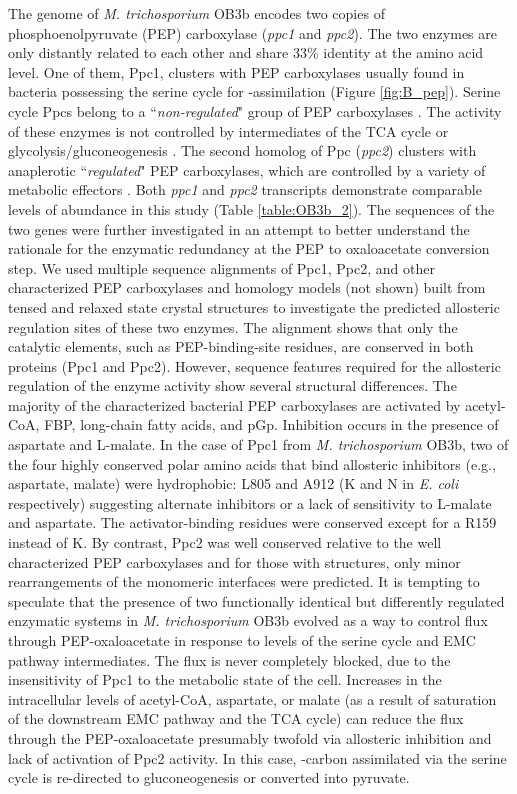 The genome of \textit{M. trichosporium} OB3b encodes two copies of phosphoenolpyruvate (PEP) carboxylase (\textit{ppc1} and \textit{ppc2}).
The two enzymes are only distantly related to each other and share 33\% identity at the amino acid level.
One of them, Ppc1, clusters with PEP carboxylases usually found in bacteria possessing the serine cycle for -assimilation (Figure \ref{fig:B_pep}).
Serine cycle Ppcs belong to a ``\textit{non-regulated}" group of PEP carboxylases \cite{anthony1982}.
The activity of these enzymes is not controlled by intermediates of the TCA cycle or glycolysis/gluconeogenesis \cite{newaz1975}.
The second homolog of Ppc (\textit{ppc2}) clusters with anaplerotic ``\textit{regulated}" PEP carboxylases, which are controlled by a variety of metabolic effectors \cite{takahashi1993, kai2003}.
Both \textit{ppc1} and \textit{ppc2} transcripts demonstrate comparable levels of abundance in this study (Table \ref{table:OB3b_2}).
The sequences of the two genes were further investigated in an attempt to better understand the rationale for the enzymatic redundancy at the PEP to oxaloacetate conversion step.
We used multiple sequence alignments of Ppc1, Ppc2, and other characterized PEP carboxylases and homology models (not shown) built from tensed and relaxed state crystal structures \cite{matsumura2002} to investigate the predicted allosteric regulation sites of these two enzymes.
The alignment shows that only the catalytic elements, such as PEP-binding-site residues, are conserved in both proteins (Ppc1 and Ppc2). %
However, sequence features required for the allosteric regulation of the enzyme activity show several structural differences.
The majority of the characterized bacterial PEP carboxylases are activated by acetyl-CoA, FBP, long-chain fatty acids, and pGp.
Inhibition occurs in the presence of aspartate and L-malate.
In the case of Ppc1 from \textit{M. trichosporium} OB3b, two of the four highly conserved polar amino acids that bind allosteric inhibitors (e.g., aspartate, malate) were hydrophobic: L805 and A912 (K and N in \textit{E. coli} respectively) suggesting alternate inhibitors or a lack of sensitivity to L-malate and aspartate.
The activator-binding residues were conserved except for a R159 instead of K.
By contrast, Ppc2 was well conserved relative to the well characterized PEP carboxylases and for those with structures, only minor rearrangements of the monomeric interfaces were predicted.
It is tempting to speculate that the presence of two functionally identical but differently regulated enzymatic systems in \textit{M. trichosporium} OB3b evolved as a way to control flux through PEP-oxaloacetate in response to levels of the serine cycle and EMC pathway intermediates.
The flux is never completely blocked, due to the insensitivity of Ppc1 to the metabolic state of the cell.
Increases in the intracellular levels of acetyl-CoA, aspartate, or malate (as a result of saturation of the downstream EMC pathway and the TCA cycle) can reduce the flux through the PEP-oxaloacetate presumably twofold via allosteric inhibition and lack of activation of Ppc2 activity.
In this case, -carbon assimilated via the serine cycle is re-directed to gluconeogenesis or converted into pyruvate.

